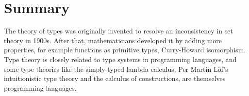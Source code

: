 





\section{Summary}


The theory of types was originally invented to resolve an inconsistency in set theory in 1900s. After that, mathematicians developed it by adding more properties, for example functions as primitive types, Curry-Howard isomorphism. Type theory is closely related to type systems in programming languages, and some type theories like the simply-typed lambda calculus, Per Martin L\"{o}f's intuitionistic type theory and the calculus of constructions, are themselves programming languages. 

